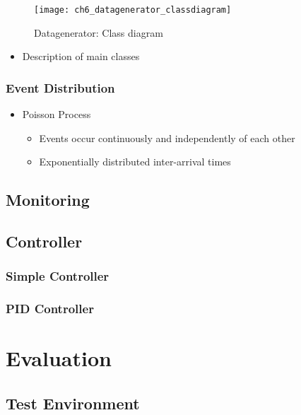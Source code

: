 \begin{figure}[htpb]
	\centering
	\texttt{[image: ch6\_datagenerator\_classdiagram]}
	\caption{Datagenerator: Class diagram}
	\label{fig:ch5_datagenerator_classdiagram}
\end{figure}

\begin{itemize}
	\item Description of main classes
\end{itemize}

\subsubsection{Event Distribution}

\begin{itemize}
	\item Poisson Process
	\begin{itemize}
		\item Events occur continuously and independently of each other
		\item Exponentially distributed inter-arrival times
	\end{itemize}
\end{itemize}

\subsection{Monitoring}

\subsection{Controller}

\subsubsection{Simple Controller}

\subsubsection{PID Controller}

\section{Evaluation}

\subsection{Test Environment}

